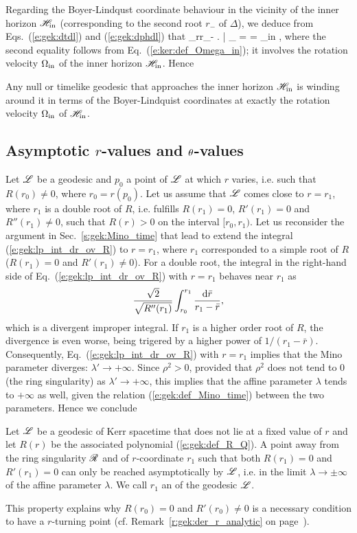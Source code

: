 Regarding the Boyer-Lindqust coordinate behaviour in the vicinity of the inner
horizon $\mathscr{H}_{\rm in}$ (corresponding to the second root $r_-$ of $\Delta$), we deduce
from
Eqs.~(\ref{e:gek:dtdl}) and
(\ref{e:gek:dphdl}) that
\be
    \lim_{r\to r_-} \left.  \right| _{\Li} =  = \Omega_{\rm in} ,
\ee
where the second equality follows from Eq.~(\ref{e:ker:def_Omega_in}); it involves
the rotation velocity $\Omega_{\rm in}$ of the inner horizon $\mathscr{H}_{\rm in}$.
Hence
\begin{greybox}
Any null or timelike geodesic that approaches the inner horizon $\mathscr{H}_{\rm in}$
is winding around it in terms of the Boyer-Lindquist coordinates at exactly the
rotation velocity $\Omega_{\rm in}$ of $\mathscr{H}_{\rm in}$.
\end{greybox}

\subsection{Asymptotic $r$-values and $\theta$-values} \label{s:gek:asymptotic_values}

Let $\mathscr{L}$ be a geodesic
and $p_0$ a point of $\mathscr{L}$ at which $r$ varies,
i.e. such that $R(r_0) \neq 0$, where $r_0 = r(p_0)$.
Let us assume that $\mathscr{L}$ comes close to $r=r_1$, where
$r_1$ is a double root of $R$, i.e. fulfills $R(r_1)=0$, $R'(r_1)=0$ and
$R''(r_1)\neq 0$, such that $R(r) > 0$ on the interval $[r_0, r_1)$.
Let us reconsider the argument in Sec.~\ref{s:gek:Mino_time}
that lead to extend the integral
(\ref{e:gek:lp_int_dr_ov_R}) to $r=r_1$, where $r_1$ corresponded to
a simple root of $R$ ($R(r_1)=0$ and $R'(r_1)\neq 0$).
For a double root,
the integral in the right-hand side of Eq.~(\ref{e:gek:lp_int_dr_ov_R}) with $r=r_1$ behaves
near $r_1$ as
\[
    \frac{\sqrt{2}}{\sqrt{R''(r_1)}} \int_{r_0}^{r_1} \frac{\mathrm{d} \bar{r}}{r_1 - \bar{r}} ,
\]
which is a divergent improper integral. If $r_1$ is a higher order root of $R$,
the divergence is even worse, being trigered by a higher power of $1/(r_1 - \bar{r})$.
Consequently, Eq.~(\ref{e:gek:lp_int_dr_ov_R}) with $r=r_1$
implies that the Mino parameter diverges: $\lambda'\to +\infty$. Since $\rho^2 > 0$,
provided that $\rho^2$
does not tend to $0$ (the ring singularity) as $\lambda'\to +\infty$, this
implies that the affine parameter $\lambda$ tends to $+\infty$ as well, given
the relation (\ref{e:gek:def_Mino_time}) between the two parameters.
Hence we conclude
\begin{greybox}
Let $\mathscr{L}$ be a geodesic of Kerr spacetime that does not lie at a fixed value of $r$
and let $R(r)$ be the associated polynomial
(\ref{e:gek:def_R_Q}).
A point away from the ring singularity $\mathscr{R}$ and of $r$-coordinate $r_1$
such that both $R(r_1) = 0$ and $R'(r_1) = 0$
can only be reached asymptotically by $\mathscr{L}$, i.e. in the limit
$\lambda\to \pm\infty$ of the affine parameter
$\lambda$. We call $r_1$ an  of the geodesic $\mathscr{L}$.
\end{greybox}
This property explains why $R(r_0) = 0$ and $R'(r_0) \neq 0$ is a necessary condition
to have a $r$-turning point (cf. Remark~\ref{r:gek:der_r_analytic} on page~\pageref{r:gek:der_r_analytic}).

